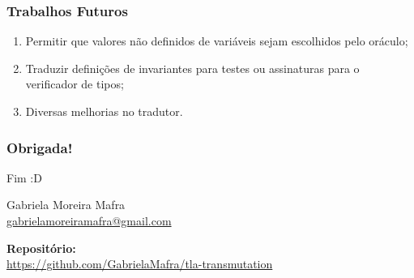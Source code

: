 \documentclass{beamer}
\begin{document}
\begin{frame}
  \frametitle{Trabalhos Futuros}
  \begin{enumerate}
    \item Permitir que valores não definidos de variáveis sejam escolhidos
      pelo oráculo;
    \item Traduzir definições de invariantes para testes ou assinaturas para o
      verificador de tipos;
    \item Diversas melhorias no tradutor.
  \end{enumerate}
\end{frame}

\begin{frame}
  \frametitle{Obrigada!}

  {\Huge Fim :D}\bigskip

  Gabriela Moreira Mafra\\\smallskip
  {\url{gabrielamoreiramafra@gmail.com}}\\\bigskip

  \textbf{Repositório:}\\
  {\url{https://github.com/GabrielaMafra/tla-transmutation}}

\end{frame}
\end{document}
